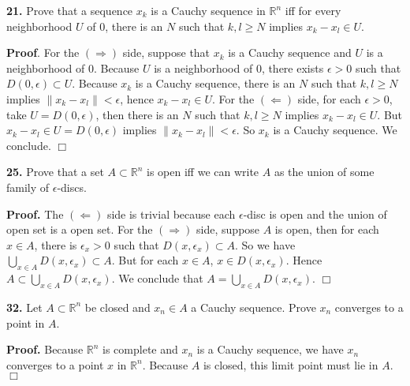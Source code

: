 \documentclass{article}
\begin{document}
    \textbf{21.} Prove that a sequence $x_k$ is a Cauchy sequence in
$\mathbb{R}^n$ iff for every neighborhood $U$ of $0$, there is an $N$
such that $k,l \ge N$ implies $x_k - x_l \in U$.

\textbf{Proof}. For the $(\Rightarrow)$ side, suppose that $x_k$ is a
Cauchy sequence and $U$ is a neighborhood of $0$. Because $U$ is a
neighborhood of $0$, there exists $\epsilon > 0$ such that
$D(0,\epsilon) \subset U$. Because $x_k$ is a Cauchy sequence, there is
an $N$ such that $k,l\ge N$ implies $\|x_k - x_l\| < \epsilon$, hence
$x_k-x_l \in U$. For the $(\Leftarrow)$ side, for each $\epsilon > 0$,
take $U = D(0,\epsilon)$, then there is an $N$ such that $k,l \ge N$
implies $x_k -x_l \in U$. But $x_k - x_l \in U=D(0,\epsilon)$ implies
$\|x_k-x_l\| < \epsilon$. So $x_k$ is a Cauchy sequence. We conclude.
$\Box$

    \textbf{25.} Prove that a set $A\subset \mathbb{R}^n$ is open iff we can
write $A$ as the union of some family of $\epsilon$-discs.

\textbf{Proof.} The $(\Leftarrow)$ side is trivial because each
$\epsilon$-disc is open and the union of open set is a open set. For the
$(\Rightarrow)$ side, suppose $A$ is open, then for each $x\in A$, there
is $\epsilon_x > 0$ such that $D(x,\epsilon_x) \subset A$. So we have
$\bigcup_{x\in A} D(x,\epsilon_x) \subset A$. But for each $x\in A$,
$x\in D(x,\epsilon_x)$. Hence
$A \subset \bigcup_{x\in A}D(x,\epsilon_x)$. We conclude that
$A = \bigcup_{x\in A}D(x,\epsilon_x)$. $\Box$

    \textbf{32.} Let $A\subset \mathbb{R}^n$ be closed and $x_n\in A$ a
Cauchy sequence. Prove $x_n$ converges to a point in $A$.

\textbf{Proof.} Because $\mathbb{R}^n$ is complete and $x_n$ is a Cauchy
sequence, we have $x_n$ converges to a point $x$ in $\mathbb{R}^n$.
Because $A$ is closed, this limit point must lie in $A$. $\Box$


    
    
    
    
\end{document}
